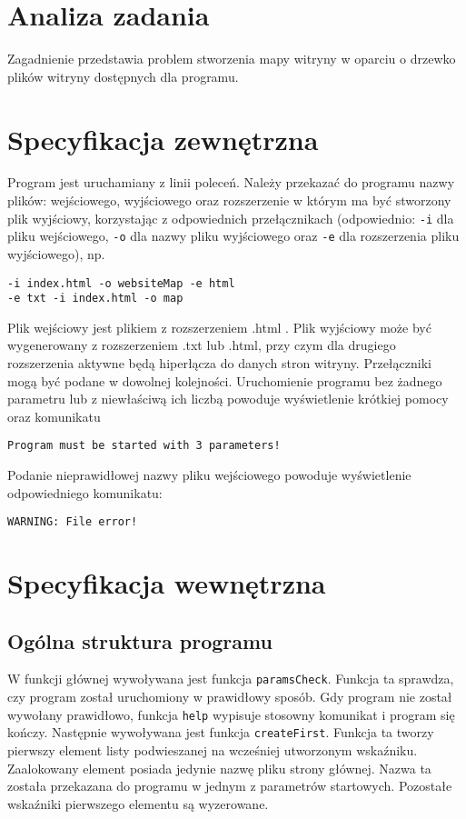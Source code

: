 \documentclass[12pt,a4paper,twoside]{article}
\begin{document}
\section{Analiza zadania}

Zagadnienie przedstawia problem stworzenia mapy witryny w oparciu o drzewko plików witryny dostępnych dla programu.
\section{Specyfikacja zewnętrzna}
\label{sec:sp:zewnetrzna}
Program jest uruchamiany z linii poleceń. Należy przekazać do programu nazwy plików: wejściowego, wyjściowego oraz rozszerzenie w którym ma być stworzony plik wyjściowy, korzystając z odpowiednich przełącznikach (odpowiednio: \texttt{-i} dla pliku wejściowego, \texttt{-o} dla nazwy pliku wyjściowego oraz \texttt{-e} dla rozszerzenia pliku wyjściowego), np.
\begin{verbatim}
-i index.html -o websiteMap -e html
-e txt -i index.html -o map
\end{verbatim}
Plik wejściowy jest plikiem z rozszerzeniem .html . Plik wyjściowy może być wygenerowany z rozszerzeniem .txt lub .html, przy czym dla drugiego rozszerzenia aktywne będą hiperłącza do danych stron witryny. Przełączniki mogą być podane w dowolnej kolejności. Uruchomienie programu bez żadnego parametru lub z niewłaściwą ich liczbą powoduje wyświetlenie krótkiej pomocy oraz komunikatu
\begin{verbatim}
Program must be started with 3 parameters!
\end{verbatim}

Podanie nieprawidłowej nazwy pliku wejściowego powoduje wyświetlenie odpowiedniego komunikatu:
\begin{verbatim}
WARNING: File error!
\end{verbatim}


\section{Specyfikacja wewnętrzna}\label{sec:sp-wew}

\subsection{Ogólna struktura programu}
W funkcji głównej wywoływana jest funkcja \lstinline|paramsCheck|.
Funkcja ta sprawdza, czy program został uruchomiony w prawidłowy sposób. Gdy program nie został wywołany prawidłowo, funkcja \lstinline|help| wypisuje stosowny komunikat i program się kończy.
Następnie wywoływana jest funkcja \lstinline|createFirst|.
Funkcja ta tworzy pierwszy element listy podwieszanej na wcześniej utworzonym wskaźniku. Zaalokowany element posiada jedynie nazwę pliku strony głównej. Nazwa ta została przekazana do programu w jednym z parametrów startowych. Pozostałe wskaźniki pierwszego elementu są wyzerowane.
\end{document}
